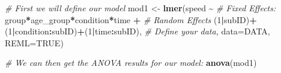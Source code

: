 \documentclass[]{article}
\newenvironment{Shaded}{\begin{snugshade}}{\end{snugshade}}
\newcommand{\CommentTok}[1]{\textcolor[rgb]{0.56,0.35,0.01}{\textit{#1}}}
\newcommand{\DataTypeTok}[1]{\textcolor[rgb]{0.13,0.29,0.53}{#1}}
\newcommand{\DecValTok}[1]{\textcolor[rgb]{0.00,0.00,0.81}{#1}}
\newcommand{\KeywordTok}[1]{\textcolor[rgb]{0.13,0.29,0.53}{\textbf{#1}}}
\newcommand{\NormalTok}[1]{#1}
\newcommand{\OperatorTok}[1]{\textcolor[rgb]{0.81,0.36,0.00}{\textbf{#1}}}
\newcommand{\OtherTok}[1]{\textcolor[rgb]{0.56,0.35,0.01}{#1}}
\newcommand{\StringTok}[1]{\textcolor[rgb]{0.31,0.60,0.02}{#1}}
\begin{document}
\begin{Shaded}
\begin{Highlighting}[]
\CommentTok{\# First we will define our model}
\NormalTok{mod1 <{-}}\StringTok{ }\KeywordTok{lmer}\NormalTok{(speed }\OperatorTok{\textasciitilde{}}\StringTok{ }
\StringTok{               }\CommentTok{\# Fixed Effects:}
\StringTok{               }\NormalTok{group}\OperatorTok{*}\NormalTok{age\_group}\OperatorTok{*}\NormalTok{condition}\OperatorTok{*}\NormalTok{time }\OperatorTok{+}\StringTok{ }
\StringTok{               }\CommentTok{\# Random Effects}
\StringTok{               }\NormalTok{(}\DecValTok{1}\OperatorTok{|}\NormalTok{subID)}\OperatorTok{+}\NormalTok{(}\DecValTok{1}\OperatorTok{|}\NormalTok{condition}\OperatorTok{:}\NormalTok{subID)}\OperatorTok{+}\NormalTok{(}\DecValTok{1}\OperatorTok{|}\NormalTok{time}\OperatorTok{:}\NormalTok{subID), }
               \CommentTok{\# Define your data, }
             \DataTypeTok{data=}\NormalTok{DATA, }\DataTypeTok{REML=}\OtherTok{TRUE}\NormalTok{)}

\CommentTok{\# We can then get the ANOVA results for our model:}
\KeywordTok{anova}\NormalTok{(mod1)}
\end{Highlighting}
\end{Shaded}
\end{document}
